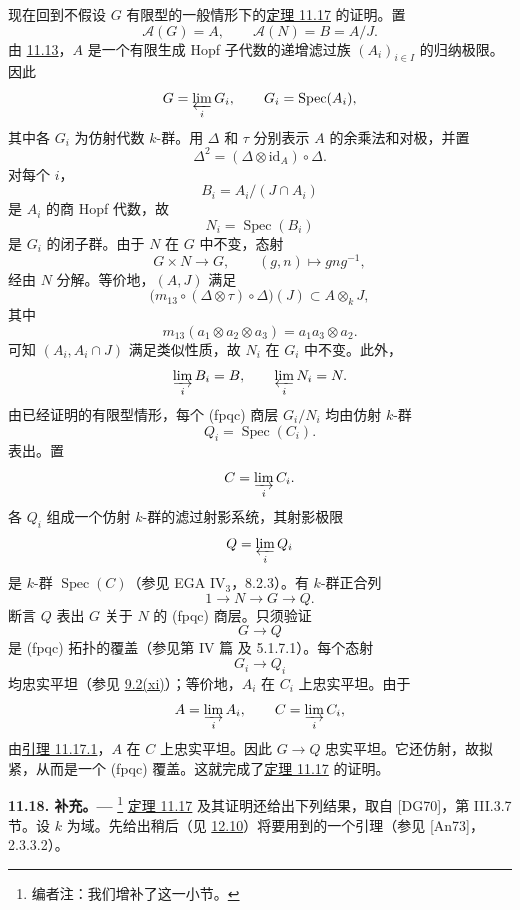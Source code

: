 现在回到不假设 \(G\) 有限型的一般情形下的\hyperref[thm:sga3-VIB-11.17]{定理 11.17} 的证明。置
\[
  \mathcal A(G)=A,
  \qquad
  \mathcal A(N)=B=A/J.
\]
由 \hyperref[prop:sga3-VIB-11.13]{11.13}，\(A\) 是一个有限生成 Hopf 子代数的递增滤过族 \((A_i)_{i\in I}\) 的归纳极限。因此
\[
  G=\varprojlim_iG_i,
  \qquad
  G_i=\operatorname{Spec}(A_i),
\]
其中各 \(G_i\) 为仿射代数 \(k\)-群。用 \(\Delta\) 和 \(\tau\) 分别表示 \(A\) 的余乘法和对极，并置
\[
  \Delta^2=(\Delta\otimes\mathrm{id}_A)\circ\Delta.
\]
对每个 \(i\)，
\[
  B_i=A_i/(J\cap A_i)
\]
是 \(A_i\) 的商 Hopf 代数，故
\[
  N_i=\operatorname{Spec}(B_i)
\]
是 \(G_i\) 的闭子群。由于 \(N\) 在 \(G\) 中不变，态射
\[
  G\times N\longrightarrow G,\qquad
  (g,n)\longmapsto gng^{-1},
\]
经由 \(N\) 分解。等价地，\((A,J)\) 满足
\label{form:sga3-VIB-11.17-conjugation-coideal}%
\[
  \bigl(m_{13}\circ(\Delta\otimes\tau)\circ\Delta\bigr)(J)
    \subset A\otimes_kJ,
\]
其中
\[
  m_{13}(a_1\otimes a_2\otimes a_3)
    =a_1a_3\otimes a_2.
\]
可知 \((A_i,A_i\cap J)\) 满足类似性质，故 \(N_i\) 在 \(G_i\) 中不变。此外，
\[
  \varinjlim_iB_i=B,
  \qquad
  \varprojlim_iN_i=N.
\]
由已经证明的有限型情形，每个 \textup{(fpqc)} 商层 \(G_i/N_i\) 均由仿射 \(k\)-群
\[
  Q_i=\operatorname{Spec}(C_i).
\]
表出。置
\[
  C=\varinjlim_iC_i.
\]
各 \(Q_i\) 组成一个仿射 \(k\)-群的滤过射影系统，其射影极限
\[
  Q=\varprojlim_iQ_i
\]
是 \(k\)-群 \(\operatorname{Spec}(C)\)\textup{（参见 EGA IV\(_3\)，8.2.3）}。有 \(k\)-群正合列
\label{seq:sga3-VIB-11.17-Q}%
\[
  1\longrightarrow N\longrightarrow G\longrightarrow Q.
\]
断言 \(Q\) 表出 \(G\) 关于 \(N\) 的 \textup{(fpqc)} 商层。只须验证
\[
  G\longrightarrow Q
\]
是 \textup{(fpqc)} 拓扑的覆盖\textup{（参见第 IV 篇  及 5.1.7.1）}。每个态射
\[
  G_i\longrightarrow Q_i
\]
均忠实平坦\textup{（参见 \hyperref[concl:sga3-VIB-9.2-xi]{9.2\textup{(xi)}}）}；等价地，\(A_i\) 在 \(C_i\) 上忠实平坦。由于
\[
  A=\varinjlim_iA_i,
  \qquad
  C=\varinjlim_iC_i,
\]
由\hyperref[lem:sga3-VIB-11.17.1]{引理 11.17.1}，\(A\) 在 \(C\) 上忠实平坦。因此 \(G\to Q\) 忠实平坦。它还仿射，故拟紧，从而是一个 \textup{(fpqc)} 覆盖。这就完成了\hyperref[thm:sga3-VIB-11.17]{定理 11.17} 的证明。

\medskip
{}\label{par:sga3-VIB-11.18}%
\noindent\textbf{11.18. 补充。---}%
\footnote{\label{note:sga3-VIB-134}编者注：我们增补了这一小节。}
\hyperref[thm:sga3-VIB-11.17]{定理 11.17} 及其证明还给出下列结果，取自 \textup{[DG70]}，第 III.3.7 节。设 \(k\) 为域。先给出稍后\textup{（见 \hyperref[prop:sga3-VIB-12.10]{12.10}）}将要用到的一个引理\textup{（参见 \textup{[An73]}，2.3.3.2）}。

